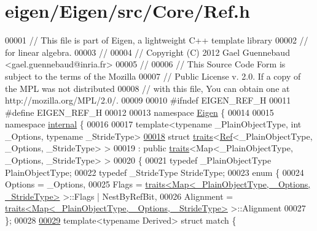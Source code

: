 \hypertarget{eigen_2_eigen_2src_2_core_2_ref_8h_source}{}\section{eigen/\+Eigen/src/\+Core/\+Ref.h}
\label{eigen_2_eigen_2src_2_core_2_ref_8h_source}

\begin{DoxyCode}
00001 \textcolor{comment}{// This file is part of Eigen, a lightweight C++ template library}
00002 \textcolor{comment}{// for linear algebra.}
00003 \textcolor{comment}{//}
00004 \textcolor{comment}{// Copyright (C) 2012 Gael Guennebaud <gael.guennebaud@inria.fr>}
00005 \textcolor{comment}{//}
00006 \textcolor{comment}{// This Source Code Form is subject to the terms of the Mozilla}
00007 \textcolor{comment}{// Public License v. 2.0. If a copy of the MPL was not distributed}
00008 \textcolor{comment}{// with this file, You can obtain one at http://mozilla.org/MPL/2.0/.}
00009 
00010 \textcolor{preprocessor}{#ifndef EIGEN\_REF\_H}
00011 \textcolor{preprocessor}{#define EIGEN\_REF\_H}
00012 
00013 \textcolor{keyword}{namespace }\hyperlink{namespace_eigen}{Eigen} \{ 
00014 
00015 \textcolor{keyword}{namespace }\hyperlink{namespaceinternal}{internal} \{
00016 
00017 \textcolor{keyword}{template}<\textcolor{keyword}{typename} \_PlainObjectType, \textcolor{keywordtype}{int} \_Options, \textcolor{keyword}{typename} \_Str\textcolor{keywordtype}{id}eType>
\hyperlink{struct_eigen_1_1internal_1_1traits_3_01_ref_3_01___plain_object_type_00_01___options_00_01___stride_type_01_4_01_4}{00018} \textcolor{keyword}{struct }\hyperlink{struct_eigen_1_1internal_1_1traits}{traits}<\hyperlink{group___core___module_class_eigen_1_1_ref}{Ref}<\_PlainObjectType, \_Options, \_StrideType> >
00019   : \textcolor{keyword}{public} \hyperlink{struct_eigen_1_1internal_1_1traits}{traits}<Map<\_PlainObjectType, \_Options, \_StrideType> >
00020 \{
00021   \textcolor{keyword}{typedef} \_PlainObjectType PlainObjectType;
00022   \textcolor{keyword}{typedef} \_StrideType StrideType;
00023   \textcolor{keyword}{enum} \{
00024     Options = \_Options,
00025     Flags = \hyperlink{struct_eigen_1_1internal_1_1traits}{traits<Map<\_PlainObjectType, \_Options, \_StrideType>}
       >::Flags | NestByRefBit,
00026     Alignment = \hyperlink{struct_eigen_1_1internal_1_1traits}{traits<Map<\_PlainObjectType, \_Options, \_StrideType>}
       >::Alignment
00027   \};
00028 
\hyperlink{struct_eigen_1_1internal_1_1traits_3_01_ref_3_01___plain_object_type_00_01___options_00_01___stride_type_01_4_01_4_1_1match}{00029}   \textcolor{keyword}{template}<\textcolor{keyword}{typename} Derived> \textcolor{keyword}{struct }match \{

\end{DoxyCode}
